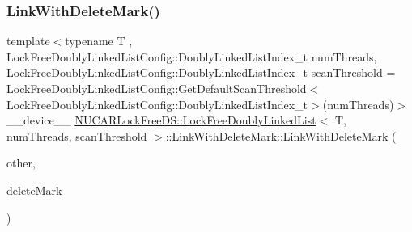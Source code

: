 \subsubsection{\texorpdfstring{Link\+With\+Delete\+Mark()}{LinkWithDeleteMark()}\hspace{0.1cm}{\footnotesize\ttfamily [3/5]}}
{\footnotesize\ttfamily template$<$typename T , Lock\+Free\+Doubly\+Linked\+List\+Config\+::\+Doubly\+Linked\+List\+Index\+\_\+t num\+Threads, Lock\+Free\+Doubly\+Linked\+List\+Config\+::\+Doubly\+Linked\+List\+Index\+\_\+t scan\+Threshold = Lock\+Free\+Doubly\+Linked\+List\+Config\+::\+Get\+Default\+Scan\+Threshold$<$\+Lock\+Free\+Doubly\+Linked\+List\+Config\+::\+Doubly\+Linked\+List\+Index\+\_\+t$>$(num\+Threads)$>$ \\
\+\_\+\+\_\+device\+\_\+\+\_\+ \mbox{\hyperlink{class_n_u_c_a_r_lock_free_d_s_1_1_lock_free_doubly_linked_list}{N\+U\+C\+A\+R\+Lock\+Free\+D\+S\+::\+Lock\+Free\+Doubly\+Linked\+List}}$<$ T, num\+Threads, scan\+Threshold $>$\+::Link\+With\+Delete\+Mark\+::\+Link\+With\+Delete\+Mark (\begin{DoxyParamCaption}\item[{const \mbox{\hyperlink{class_n_u_c_a_r_lock_free_d_s_1_1_lock_free_doubly_linked_list_1_1_link_with_delete_mark}{Link\+With\+Delete\+Mark}} \&}]{other,  }\item[{const bool}]{delete\+Mark }\end{DoxyParamCaption})\hspace{0.3cm}{\ttfamily [inline]}}

\mbox{\label{class_n_u_c_a_r_lock_free_d_s_1_1_lock_free_doubly_linked_list_1_1_link_with_delete_mark_a7b9929a559282ece56e8ae86c6c0957b}} 
